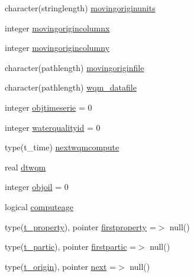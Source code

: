 \begin{DoxyCompactItemize}
\item 
character(stringlength) \mbox{\hyperlink{structmodulelagrangian_1_1t__origin_a76dc118cbb86120d73d60586fc5ad6f6}{movingoriginunits}}
\item 
integer \mbox{\hyperlink{structmodulelagrangian_1_1t__origin_ab2cdceda8792f15d611b375fac2f6bbe}{movingorigincolumnx}}
\item 
integer \mbox{\hyperlink{structmodulelagrangian_1_1t__origin_ab44ea2d9e007a9c9b7366c694f16c8ba}{movingorigincolumny}}
\item 
character(pathlength) \mbox{\hyperlink{structmodulelagrangian_1_1t__origin_aa8012abbedb33e7ecca5951c2343bd2c}{movingoriginfile}}
\item 
character(pathlength) \mbox{\hyperlink{structmodulelagrangian_1_1t__origin_a467b88c754ee08ff0274d032c1ecc1d5}{wqm\+\_\+datafile}}
\item 
integer \mbox{\hyperlink{structmodulelagrangian_1_1t__origin_a44395f0e4ef02ef99322ef1ce6301ccd}{objtimeserie}} = 0
\item 
integer \mbox{\hyperlink{structmodulelagrangian_1_1t__origin_a52052d5602822f7da799921466424c13}{waterqualityid}} = 0
\item 
type(t\+\_\+time) \mbox{\hyperlink{structmodulelagrangian_1_1t__origin_a4bf1b1f7ed597d696b55a301435cfa2a}{nextwqmcompute}}
\item 
real \mbox{\hyperlink{structmodulelagrangian_1_1t__origin_a2c501740c338a91d8784c7e02c62aef1}{dtwqm}}
\item 
integer \mbox{\hyperlink{structmodulelagrangian_1_1t__origin_a33c41103d5583dde65be6e0c22b0cf98}{objoil}} = 0
\item 
logical \mbox{\hyperlink{structmodulelagrangian_1_1t__origin_ae6c5465e82dcd145c960564d9e5db86e}{computeage}}
\item 
type(\mbox{\hyperlink{structmodulelagrangian_1_1t__property}{t\+\_\+property}}), pointer \mbox{\hyperlink{structmodulelagrangian_1_1t__origin_a9bcce801c741621c1ccdee4c4a9d5e5f}{firstproperty}} =$>$ null()
\item 
type(\mbox{\hyperlink{structmodulelagrangian_1_1t__partic}{t\+\_\+partic}}), pointer \mbox{\hyperlink{structmodulelagrangian_1_1t__origin_a709426b67021a48b19adfacb0964f084}{firstpartic}} =$>$ null()
\item 
type(\mbox{\hyperlink{structmodulelagrangian_1_1t__origin}{t\+\_\+origin}}), pointer \mbox{\hyperlink{structmodulelagrangian_1_1t__origin_a383364b4f853c69044f1ed306342c326}{next}} =$>$ null()
\item 

\end{DoxyCompactItemize}
